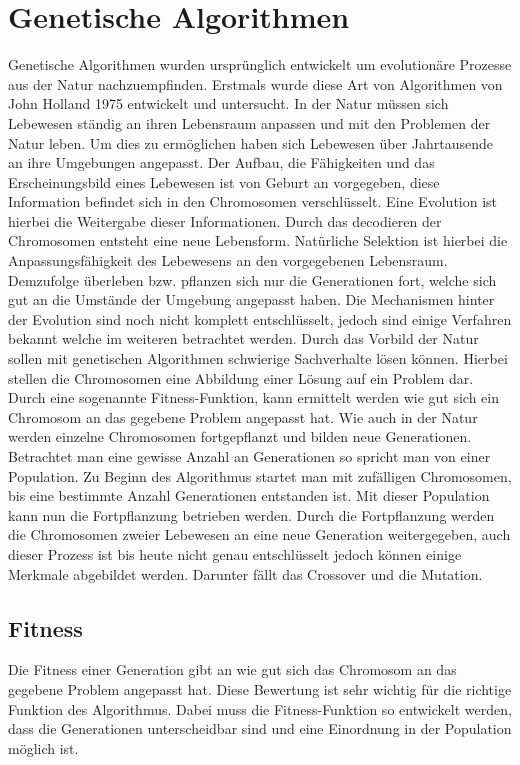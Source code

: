 \section{Genetische Algorithmen}
\label{sec:genetischer_algo}
Genetische Algorithmen wurden ursprünglich entwickelt um evolutionäre Prozesse aus der Natur nachzuempfinden. Erstmals wurde diese Art von Algorithmen von John Holland 1975 entwickelt und untersucht.
In der Natur müssen sich Lebewesen ständig an ihren Lebensraum anpassen und mit den Problemen der Natur leben. Um dies zu ermöglichen haben sich Lebewesen über Jahrtausende an ihre Umgebungen angepasst. Der Aufbau, die Fähigkeiten und das Erscheinungsbild eines Lebewesen ist von Geburt an vorgegeben, diese Information befindet sich in den Chromosomen verschlüsselt. Eine Evolution ist hierbei die Weitergabe dieser Informationen. Durch das decodieren der Chromosomen entsteht eine neue Lebensform.
Natürliche Selektion ist hierbei die Anpassungsfähigkeit des Lebewesens an den vorgegebenen Lebensraum. Demzufolge überleben bzw. pflanzen sich nur die Generationen fort, welche sich gut an die Umstände der Umgebung angepasst haben. Die Mechanismen hinter der Evolution sind noch nicht komplett entschlüsselt, jedoch sind einige Verfahren bekannt welche im weiteren betrachtet werden.
Durch das Vorbild der Natur sollen mit genetischen Algorithmen schwierige Sachverhalte lösen können. Hierbei stellen die Chromosomen eine Abbildung einer Lösung auf ein Problem dar. Durch eine sogenannte Fitness-Funktion, kann ermittelt werden wie gut sich ein Chromosom an das gegebene Problem angepasst hat. Wie auch in der Natur werden einzelne Chromosomen fortgepflanzt und bilden neue Generationen. Betrachtet man eine gewisse Anzahl an Generationen so spricht man von einer Population. Zu Beginn des Algorithmus startet man mit zufälligen Chromosomen, bis eine bestimmte Anzahl Generationen entstanden ist. Mit dieser Population kann nun die Fortpflanzung betrieben werden.
Durch die Fortpflanzung werden die Chromosomen zweier Lebewesen an eine neue Generation weitergegeben, auch dieser Prozess ist bis heute nicht genau entschlüsselt jedoch können einige Merkmale abgebildet werden. Darunter fällt das Crossover und die Mutation.\cite{davis1991handbook}

\subsection{Fitness}
Die Fitness einer Generation gibt an wie gut sich das Chromosom an das gegebene Problem angepasst hat. Diese Bewertung ist sehr wichtig für die richtige Funktion des Algorithmus. Dabei muss die Fitness-Funktion so entwickelt werden, dass die Generationen unterscheidbar sind und eine Einordnung in der Population möglich ist. 

